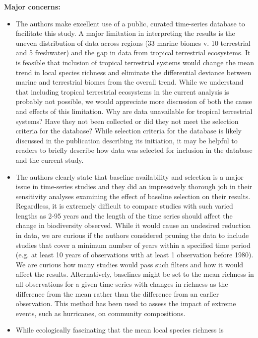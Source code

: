 \documentclass[10pt]{article}
\providecommand{\tightlist}{\setlength{\itemsep}{0pt}\setlength{\parskip}{0pt}}%
\begin{document}
\textbf{Major concerns:}

\begin{itemize}
\tightlist
\item
  The authors make excellent use of a public, curated time-series
  database to facilitate this study. A major limitation in interpreting
  the results is the uneven distribution of data across regions (33
  marine biomes v. 10 terrestrial and 5 freshwater) and the gap in data
  from tropical terrestrial ecosystems. It is feasible that inclusion of
  tropical terrestrial systems would change the mean trend in local
  species richness and eliminate the differential deviance between
  marine and terrestrial biomes from the overall trend. While we
  understand that including tropical terrestrial ecosystems in the
  current analysis is probably not possible, we would appreciate more
  discussion of both the cause and effects of this limitation. Why are
  data unavailable for tropical terrestrial systems? Have they not been
  collected or did they not meet the selection criteria for the
  database? While selection criteria for the database is likely
  discussed in the publication describing its initiation, it may be
  helpful to readers to briefly describe how data was selected for
  inclusion in the database and the current study.
\item
  The authors clearly state that baseline availability and selection is
  a major issue in time-series studies and they did an impressively
  thorough job in their sensitivity analyses examining the effect of
  baseline selection on their results. Regardless, it is extremely
  difficult to compare studies with such varied lengths as 2-95 years
  and the length of the time series should affect the change in
  biodiversity observed. While it would cause an undesired reduction in
  data, we are curious if the authors considered pruning the data to
  include studies that cover a minimum number of years within a
  specified time period (e.g. at least 10 years of observations with at
  least 1 observation before 1980). We are curious how many studies
  would pass such filters and how it would affect the results.
  Alternatively, baselines might be set to the mean richness in all
  observations for a given time-series with changes in richness as the
  difference from the mean rather than the difference from an earlier
  observation. This method has been used to assess the impact of extreme
  events, such as hurricanes, on community compositions.~
\item
  While ecologically fascinating that the mean local species richness is

\end{itemize}
\end{document}
